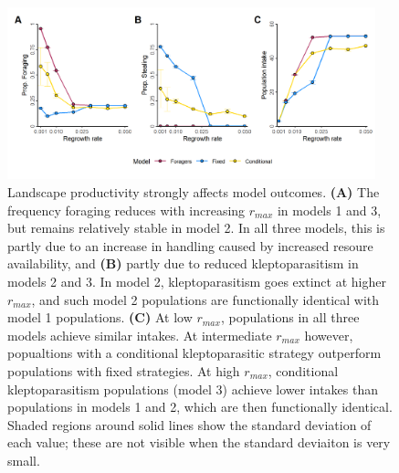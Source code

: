 \documentclass[11pt]{article}
\begin{document}
\begin{figure}[h!]
    \centering
    \includegraphics[width=0.95\textwidth]{figures/fig_06.png}
    \caption{Landscape productivity strongly affects model outcomes.
    \textbf{(A)} The frequency foraging reduces with increasing $r_{max}$ in models 1 and 3, but remains relatively stable in model 2. In all three models, this is partly due to an increase in handling caused by increased resoure availability, and \textbf{(B)} partly due to reduced kleptoparasitism in models 2 and 3. In model 2, kleptoparasitism goes extinct at higher $r_{max}$, and such model 2 populations are functionally identical with model 1 populations.
    \textbf{(C)} At low $r_{max}$, populations in all three models achieve similar intakes. At intermediate $r_{max}$ however, popualtions with a conditional kleptoparasitic strategy outperform populations with fixed strategies. At high $r_{max}$, conditional kleptoparasitism populations (model 3) achieve lower intakes than populations in models 1 and 2, which are then functionally identical.
    Shaded regions around solid lines show the standard deviation of each value; these are not visible when the standard deviaiton is very small.
    }
    \label{Fig:Sensitivity}
\end{figure}





\end{document}
